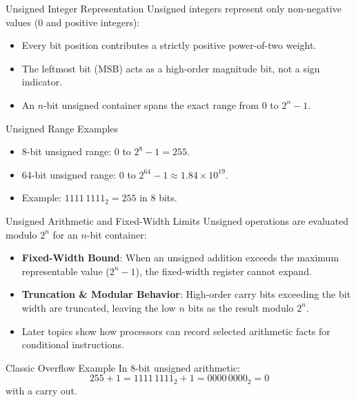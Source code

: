 \documentclass[aspectratio=169,11pt,t]{beamer}
\newcommand{\key}[1]{\textbf{#1}}
\begin{document}
\begin{frame}{Unsigned Integer Representation}
Unsigned integers represent only non-negative values ($0$ and positive integers):
\vspace{0.2em}
\begin{itemize}
\item Every bit position contributes a strictly positive power-of-two weight.
\item The leftmost bit (MSB) acts as a high-order magnitude bit, not a sign indicator.
\item An $n$-bit unsigned container spans the exact range from $0$ to $2^n - 1$.
\end{itemize}
\vspace{0.3em}
\begin{block}{Unsigned Range Examples}
\begin{itemize}
\item 8-bit unsigned range: $0$ to $2^8 - 1 = 255$.
\item 64-bit unsigned range: $0$ to $2^{64} - 1 \approx 1.84 \times 10^{19}$.
\item Example: $1111\,1111_2 = 255$ in 8 bits.
\end{itemize}
\end{block}
\end{frame}






\begin{frame}{Unsigned Arithmetic and Fixed-Width Limits}
Unsigned operations are evaluated modulo $2^n$ for an $n$-bit container:
\vspace{0.2em}
\begin{itemize}
\item \key{Fixed-Width Bound}: When an unsigned addition exceeds the maximum representable value ($2^n - 1$), the fixed-width register cannot expand.
\item \key{Truncation \& Modular Behavior}: High-order carry bits exceeding the bit width are truncated, leaving the low $n$ bits as the result modulo $2^n$.
\item Later topics show how processors can record selected arithmetic facts for conditional instructions.
\end{itemize}
\vspace{0.3em}
\begin{block}{Classic Overflow Example}
In 8-bit unsigned arithmetic:
\[
255 + 1
=
1111\,1111_2 + 1
=
0000\,0000_2
=
0
\]
with a carry out.
\end{block}
\end{frame}
\end{document}
